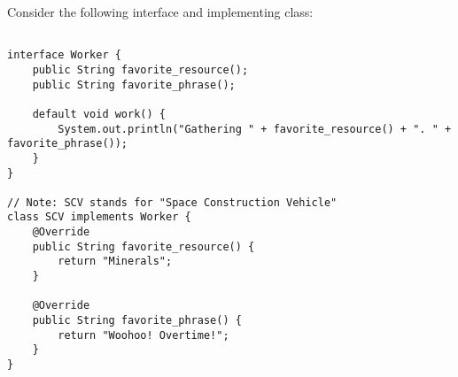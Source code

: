 \question

Consider the following interface and implementing class:

\begin{lstlisting}

interface Worker {
    public String favorite_resource();
    public String favorite_phrase();
    
    default void work() {
        System.out.println("Gathering " + favorite_resource() + ". " + favorite_phrase());
    }
}

// Note: SCV stands for "Space Construction Vehicle"
class SCV implements Worker {
    @Override
    public String favorite_resource() {
        return "Minerals";
    }

    @Override
    public String favorite_phrase() {
        return "Woohoo! Overtime!";
    }
}
\end{lstlisting}

